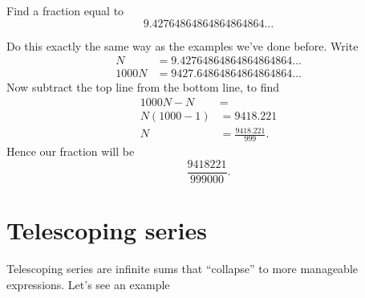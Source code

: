 \documentclass{ximera}
\begin{document}
\begin{example}
  Find a fraction equal to
  \[
  9.42764864864864864864\dots
  \]
  \begin{explanation}
    Do this exactly the same way as the examples we've done
    before. Write
    \begin{align*}
    N &=         9.42764864864864864864\dots\\
    1000 N &= 9427.64864864864864864\dots
    \end{align*}
    Now subtract the top line from the bottom line, to find
    \begin{align*}
      1000N - N &= \\
      N(1000-1) &= 9418.221\\
      N &= \frac{9418.221}{999}.
    \end{align*}
    Hence our fraction will be
    \[
    \frac{9418221}{999000}.
    \]
  \end{explanation}
\end{example}
    

\section{Telescoping series}

Telescoping series are infinite sums that ``collapse'' to more
manageable expressions.  Let's see an example
\end{document}
